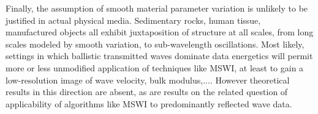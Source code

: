 Finally, the assumption of smooth material parameter variation is
unlikely to be justified in actual physical media. Sedimentary rocks,
human tissue, manufactured objects all exhibit juxtaposition of
structure at all scales, from long scales modeled by smooth variation,
to sub-wavelength oscillations. Most likely, settings in which
ballistic transmitted waves dominate data energetics will permit more
or less unmodified application of techniques like MSWI, at least to
gain a low-resolution image of wave velocity, bulk modulus,.... However
theoretical results in this direction are absent, as are results on
the related question of applicability of algorithms like MSWI to
predominantly reflected wave data.





